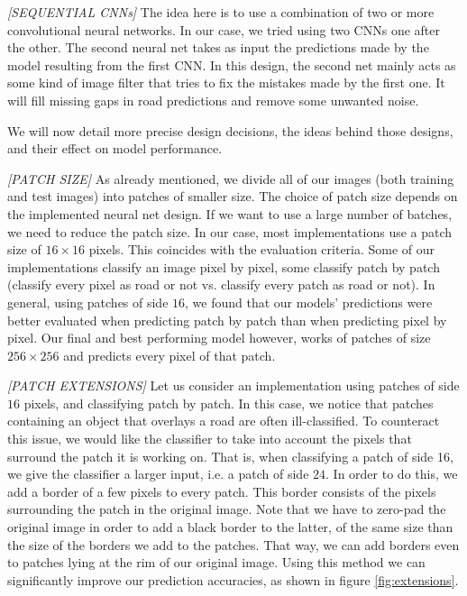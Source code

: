 \documentclass[10pt,conference,compsocconf]{IEEEtran}
\begin{document}
\smallskip
\textit{[SEQUENTIAL CNNs]}  
The idea here is to use a combination of two or more convolutional neural networks. In our case, we tried using two CNNs one after the other. The second neural net takes as input the predictions made by the model resulting from the first CNN. In this design, the second net mainly acts as some kind of image filter that tries to fix the mistakes made by the first one. It will fill missing gaps in road predictions and remove some unwanted noise.

\smallskip
We will now detail more precise design decisions, the ideas behind those designs, and their effect on model performance.

\smallskip
\textit{[PATCH SIZE]} 
As already mentioned, we divide all of our images (both training and test images) into patches of smaller size. The choice of patch size depends on the implemented neural net design. If we want to use a large number of batches, we need to reduce the patch size. In our case, most implementations use a patch size of $16 \times 16$ pixels. This coincides with the evaluation criteria. Some of our implementations classify an image pixel by pixel, some classify patch by patch (classify every pixel as road or not vs. classify every patch as road or not). In general, using patches of side $16$, we found that our models' predictions were better evaluated when predicting patch by patch than when predicting pixel by pixel. Our final and best performing model however, works of patches of size $256 \times 256$ and predicts every pixel of that patch.

\smallskip
\textit{[PATCH EXTENSIONS]} 
Let us consider an implementation using patches of side $16$ pixels, and classifying patch by patch. In this case, we notice that patches containing an object that overlays a road are often ill-classified. To counteract this issue, we would like the classifier to take into account the pixels that surround the patch it is working on. That is, when classifying a patch of side 16, we give the classifier a larger input, i.e. a patch of side $24$. In order to do this, we add a border of a few pixels to every patch. This border consists of the pixels surrounding the patch in the original image. Note that we have to zero-pad the original image in order to add a black border to the latter, of the same size than the size of the borders we add to the patches. That way, we can add borders even to patches lying at the rim of our original image. Using this method we can significantly improve our prediction accuracies, as shown in figure \ref{fig:extensions}.
\end{document}
